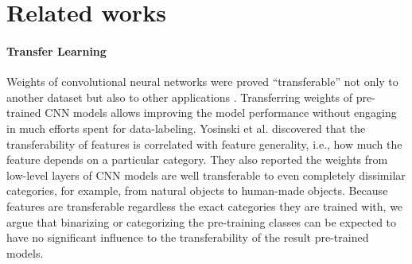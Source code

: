 \section{Related works}
\label{sec:related}

%



\paragraph{Transfer Learning}


Weights of convolutional neural networks were proved ``transferable'' not only to another dataset \cite{shin2016deep,yosinski2014transferable} but also to other applications \cite{girshick2014rich,long2015fully}.
Transferring weights of pre-trained CNN models allows improving the model performance without engaging in much efforts spent for data-labeling. \cite{pan2010survey}
Yosinski et al. \cite{yosinski2014transferable} discovered that the transferability of features is correlated with feature generality, i.e., how much the feature depends on a particular category.
They also reported the weights from low-level layers of CNN models are well transferable to even completely dissimilar categories, for example, from natural objects to human-made objects.
Because features are transferable regardless the exact categories they are trained with, we argue that binarizing or categorizing the pre-training classes can be expected to have no significant influence to the transferability of the result pre-trained models.

